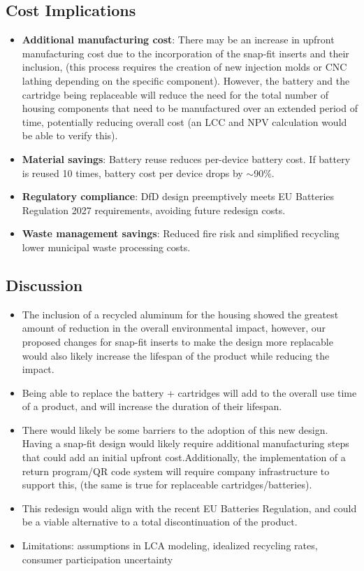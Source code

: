 \subsection{Cost Implications}

\begin{itemize}
    \item \textbf{Additional manufacturing cost}: There may be an increase in upfront manufacturing cost due to the incorporation of the snap-fit inserts and their inclusion, (this process requires the creation of new injection molds or CNC lathing depending on the specific component). However, the battery and the cartridge being replaceable will reduce the need for the total number of housing components that need to be manufactured over an extended period of time, potentially reducing overall cost (an LCC and NPV calculation would be able to verify this). 
    \item \textbf{Material savings}: Battery reuse reduces per-device battery cost. If battery is reused 10 times, battery cost per device drops by $\sim$90\%.
    \item \textbf{Regulatory compliance}: DfD design preemptively meets EU Batteries Regulation 2027 requirements, avoiding future redesign costs.
    \item \textbf{Waste management savings}: Reduced fire risk and simplified recycling lower municipal waste processing costs.
\end{itemize}

\subsection{Discussion}


\begin{itemize}
    \item The inclusion of a recycled aluminum for the housing showed the greatest amount of reduction in the overall environmental impact, however, our proposed changes for snap-fit inserts to make the design more replacable would also likely increase the lifespan of the product while reducing the impact. 
    \item Being able to replace the battery + cartridges will add to the overall use time of a product, and will increase the duration of their lifespan. 
    \item There would likely be some barriers to the adoption of this new design. Having a snap-fit design would likely require additional manufacturing steps that could add an initial upfront cost.Additionally, the implementation of a return program/QR code system will require company infrastructure to support this, (the same is true for replaceable cartridges/batteries). 
    \item This redesign would align with the recent EU Batteries Regulation, and could be a viable alternative to a total discontinuation of the product. 
    \item Limitations: assumptions in LCA modeling, idealized recycling rates, consumer participation uncertainty
\end{itemize}
